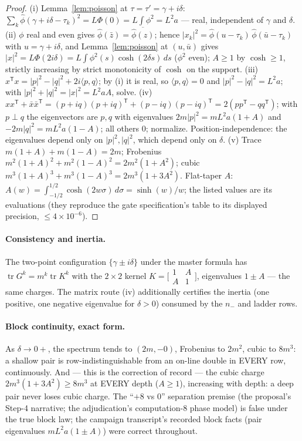 \documentclass[11pt]{article}
\theoremstyle{plain}
\theoremstyle{definition}
\theoremstyle{remark}
\newcommand{\tr}{\operatorname{tr}}
\newcommand{\ph}{\widehat{\phi}}
\begin{document}
\begin{proof}
(i) Lemma~\ref{lem:poisson} at $\tau = \tau' = \gamma + i\delta$:
$\sum_k \ph(\gamma + i\delta - \tau_k)^2 = L\Phi(0) = L \int \phi^2 = L^2 a$ ---
real, independent of $\gamma$ and $\delta$.
(ii) $\phi$ real and even gives $\ph(\bar{z}) = \overline{\ph(z)}$; hence
$|x_k|^2 = \ph(u - \tau_k)\, \ph(\bar{u} - \tau_k)$ with $u = \gamma + i\delta$,
and Lemma~\ref{lem:poisson} at $(u, \bar{u})$ gives
$|x|^2 = L\Phi(2i\delta) = L \int \phi^2(s)\cosh(2\delta s)\, ds$ ($\phi^2$
even); $A \ge 1$ by $\cosh \ge 1$, strictly increasing by strict monotonicity of
$\cosh$ on the support.
(iii) $x^{\mathsf{T}} x = |p|^2 - |q|^2 + 2i\langle p, q\rangle$; by (i) it is
real, so $\langle p, q \rangle = 0$ and $|p|^2 - |q|^2 = L^2 a$; with
$|p|^2 + |q|^2 = |x|^2 = L^2 a A$, solve.
(iv) $x x^{\mathsf{T}} + \bar{x}\bar{x}^{\mathsf{T}}
 = (p + iq)(p + iq)^{\mathsf{T}} + (p - iq)(p - iq)^{\mathsf{T}}
 = 2(p p^{\mathsf{T}} - q q^{\mathsf{T}})$; with $p \perp q$ the eigenvectors are
$p, q$ with eigenvalues $2m|p|^2 = m L^2 a (1 + A)$ and
$-2m|q|^2 = m L^2 a (1 - A)$; all others $0$; normalize. Position-independence:
the eigenvalues depend only on $|p|^2, |q|^2$, which depend only on $\delta$.
(v) Trace $m(1 + A) + m(1 - A) = 2m$; Frobenius
$m^2(1 + A)^2 + m^2(1 - A)^2 = 2m^2(1 + A^2)$; cubic
$m^3(1 + A)^3 + m^3(1 - A)^3 = 2m^3(1 + 3A^2)$. Flat-taper $A$:
$A(w) = \int_{-1/2}^{1/2} \cosh(2w\sigma)\, d\sigma = \sinh(w)/w$; the listed
values are its evaluations (they reproduce the gate specification's table to its
displayed precision, $\le 4 \times 10^{-6}$).
\end{proof}

\paragraph{Consistency and inertia.}
The two-point configuration $\{\gamma \pm i\delta\}$ under the master formula has
$\tr G^k = m^k \tr K^k$ with the $2 \times 2$ kernel
$K = \bigl[\begin{smallmatrix} 1 & A \\ A & 1 \end{smallmatrix}\bigr]$,
eigenvalues $1 \pm A$ --- the same charges. The matrix route (iv) additionally
certifies the inertia (one positive, one negative eigenvalue for $\delta > 0$)
consumed by the $n_-$ and ladder rows.

\paragraph{Block continuity, exact form.}
As $\delta \to 0+$, the spectrum tends to $(2m, -0)$, Frobenius to $2m^2$, cubic
to $8m^3$: a shallow pair is row-indistinguishable from an on-line double in
EVERY row, continuously. And --- this is the correction of record --- the cubic
charge $2m^3(1 + 3A^2) \ge 8m^3$ at EVERY depth ($A \ge 1$), increasing with
depth: a deep pair never loses cubic charge. The ``$+8$ vs $0$'' separation
premise (the proposal's Step-4 narrative; the adjudication's computation-8 phase
model) is false under the true block law; the campaign transcript's recorded
block facts (pair eigenvalues $m L^2 a (1 \pm A)$) were correct throughout.
\end{document}
